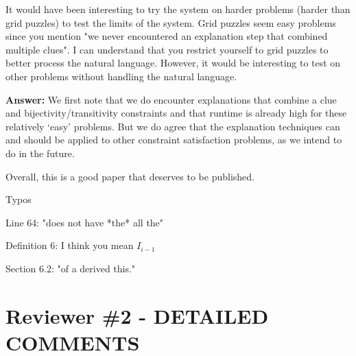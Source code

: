 \documentclass{article}
\newcommand\comment[1]{\marginpar{\tiny #1}}
\renewcommand\comment[1]{#1}
\newcommand{\tias}[1]{{\comment{\color{blue}\textsc{TG:}#1}}}
\newcommand{\emilio}[1]{{\comment{\color{red} \textsc{EG:}#1}}}
\newcommand{\answer}[1]{{\comment{\textbf{Answer:} #1}}}
\newcommand{\new}[1]{{\comment{{\color{blue} #1}}}}
\begin{document}

\begin{quoteit}
It would have been interesting to try the system on harder problems (harder than grid puzzles) to test the limits of the system.  Grid puzzles seem easy problems since you mention "we never encountered an explanation step that combined multiple clues".  I can understand that you restrict yourself to grid puzzles to better process the natural language. However, it would be interesting to test on other problems without handling the natural language.
\end{quoteit}

\answer{We first note that we do encounter explanations that combine a clue and bijectivity/transitivity constraints and that runtime is already high for these relatively `easy' problems. But we do agree that the explanation techniques can and should be applied to other constraint satisfaction problems, as we intend to do in the future.}

\begin{quoteit}
Overall, this is a good paper that deserves to be published. 

Typos

Line 64: "does not have *the* all the"

Definition 6: I think you mean $I_{i-1}
$

Section 6.2: "of a derived this."
\end{quoteit}


\section*{Reviewer \#2 - DETAILED COMMENTS}
\end{document}
